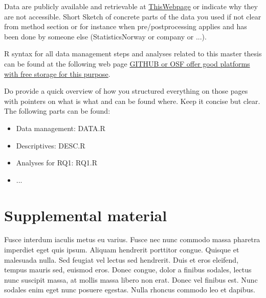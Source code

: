 \documentclass[a4paper,12pt,stu,donotrepeattitle,floatsintext,twoside]{apa7}
\begin{document}
\appindent Data are publicly available and retrievable at \url{ThisWebpage} or indicate why they are not accessible. Short Sketch of concrete parts of the data you used if not clear from method section or for instance when pre/postprocessing applies and has been done by someone else (StatisticsNorway or company or ...).


R syntax for all data management steps and analyses related to this master thesis can be found at the following web page \url{GITHUB or OSF offer good platforms with free storage for this purpose}.

Do provide a quick overview of how you structured everything on those pages with pointers on what is what and can be found where. Keep it concise but  clear. The following parts can be found:
\begin{itemize}
    \item Data management: DATA.R
    \item Descriptives: DESC.R
    \item Analyses for RQ1: RQ1.R
    \item ...
\end{itemize}

\section{Supplemental material}\label{app:C}

\appindent Fusce interdum iaculis metus eu varius. Fusce nec nunc commodo massa pharetra imperdiet eget quis ipsum. Aliquam hendrerit porttitor congue. Quisque et malesuada nulla. Sed feugiat vel lectus sed hendrerit. Duis et eros eleifend, tempus mauris sed, euismod eros. Donec congue, dolor a finibus sodales, lectus nunc suscipit massa, at mollis massa libero non erat. Donec vel finibus est. Nunc sodales enim eget nunc posuere egestas. Nulla rhoncus commodo leo et dapibus.
\end{document}
